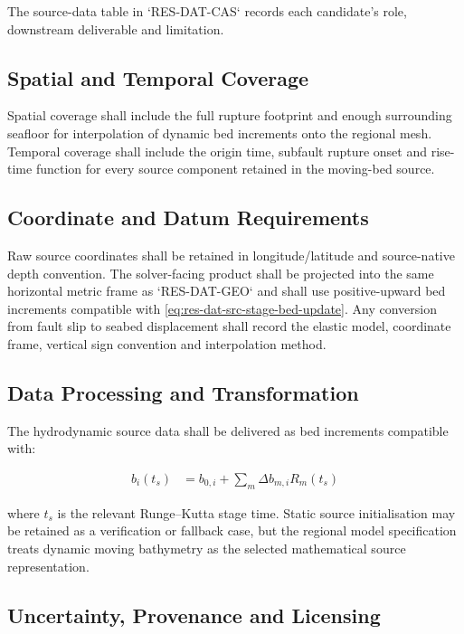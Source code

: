 The source-data table in `RES-DAT-CAS` records each candidate's role,
downstream deliverable and limitation.

\subsection{Spatial and Temporal Coverage}
\label{sec:res-dat-src-spatial-temporal-coverage}

Spatial coverage shall include the full rupture footprint and enough
surrounding seafloor for interpolation of dynamic bed increments onto
the regional mesh. Temporal coverage shall include the origin time,
subfault rupture onset and rise-time function for every source
component retained in the moving-bed source.

\subsection{Coordinate and Datum Requirements}
\label{sec:res-dat-src-coordinate-datum-requirements}

Raw source coordinates shall be retained in longitude/latitude and
source-native depth convention. The solver-facing product shall be
projected into the same horizontal metric frame as `RES-DAT-GEO` and
shall use positive-upward bed increments compatible with
\cref{eq:res-dat-src-stage-bed-update}. Any conversion from fault slip
to seabed displacement shall record the elastic model, coordinate
frame, vertical sign convention and interpolation method.

\subsection{Data Processing and Transformation}
\label{sec:res-dat-src-data-processing-transformation}

The hydrodynamic source data shall be delivered as bed increments
compatible with:

\begin{align}
  b_i(t_s)
  &=
  b_{0,i}
  +
  \sum_m
  \Delta b_{m,i}
  R_m(t_s)
  \label{eq:res-dat-src-stage-bed-update}
\end{align}

where $t_s$ is the relevant Runge--Kutta stage time. Static source
initialisation may be retained as a verification or fallback case, but
the regional model specification treats dynamic moving bathymetry as the
selected mathematical source representation.

\subsection{Uncertainty, Provenance and Licensing}
\label{sec:res-dat-src-uncertainty-provenance-licensing}


